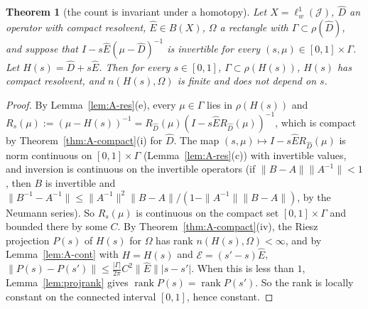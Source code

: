 \documentclass[11pt]{article}
\newtheorem{thmx}[lemma]{Theorem}
\theoremstyle{definition}
\newcommand{\rank}{\operatorname{rank}}
\begin{document}
\begin{thmx}[the count is invariant under a homotopy]\label{thm:A-homotopy}
Let $X = \ell^1_w(\mathcal J)$, $\hat D$ an operator with compact resolvent, $\hat E \in B(X)$, $\Omega$ a rectangle with $\Gamma \subset \rho(\hat D)$, and suppose that $I - s\hat E(\mu - \hat D)^{-1}$ is invertible for every $(s, \mu) \in [0,1] \times \Gamma$. Let $H(s) = \hat D + s\hat E$. Then for every $s \in [0,1]$, $\Gamma \subset \rho(H(s))$, $H(s)$ has compact resolvent, and $n(H(s), \Omega)$ is finite and does not depend on $s$.
\end{thmx}

\begin{proof}
By Lemma~\ref{lem:A-res}(e), every $\mu \in \Gamma$ lies in $\rho(H(s))$ and $R_s(\mu) := (\mu - H(s))^{-1} = R_{\hat D}(\mu)(I - s\hat ER_{\hat D}(\mu))^{-1}$, which is compact by Theorem~\ref{thm:A-compact}(i) for $\hat D$. The map $(s, \mu) \mapsto I - s\hat ER_{\hat D}(\mu)$ is norm continuous on $[0,1] \times \Gamma$ (Lemma~\ref{lem:A-res}(c)) with invertible values, and inversion is continuous on the invertible operators (if $\|B - A\|\|A^{-1}\| < 1$, then $B$ is invertible and $\|B^{-1} - A^{-1}\| \le \|A^{-1}\|^2\|B - A\|/(1 - \|A^{-1}\|\|B - A\|)$, by the Neumann series). So $R_s(\mu)$ is continuous on the compact set $[0,1] \times \Gamma$ and bounded there by some $C$. By Theorem~\ref{thm:A-compact}(iv), the Riesz projection $P(s)$ of $H(s)$ for $\Omega$ has rank $n(H(s), \Omega) < \infty$, and by Lemma~\ref{lem:A-cont} with $H = H(s)$ and $\mathcal E = (s' - s)\hat E$, $\|P(s) - P(s')\| \le \frac{|\Gamma|}{2\pi}C^2\|\hat E\||s - s'|$. When this is less than $1$, Lemma~\ref{lem:projrank} gives $\rank P(s) = \rank P(s')$. So the rank is locally constant on the connected interval $[0,1]$, hence constant.
\end{proof}
\end{document}
